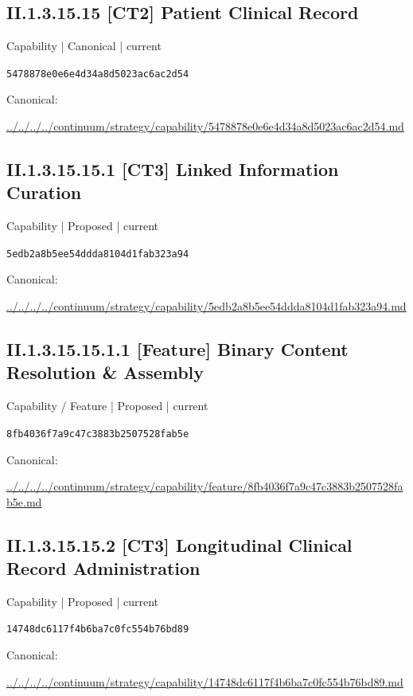 \documentclass[10pt,a4paper]{article}
\begin{document}
\subsection*{II.1.3.15.15 [CT2] Patient Clinical Record}
{\small Capability | Canonical | current}\par
\texttt{5478878e0e6e4d34a8d5023ac6ac2d54}\par
Canonical: \par
{\footnotesize\url{../../../../continuum/strategy/capability/5478878e0e6e4d34a8d5023ac6ac2d54.md}}\par
\subsection*{II.1.3.15.15.1 [CT3] Linked Information Curation}
{\small Capability | Proposed | current}\par
\texttt{5edb2a8b5ee54ddda8104d1fab323a94}\par
Canonical: \par
{\footnotesize\url{../../../../continuum/strategy/capability/5edb2a8b5ee54ddda8104d1fab323a94.md}}\par
\subsection*{II.1.3.15.15.1.1 [Feature] Binary Content Resolution \& Assembly}
{\small Capability / Feature | Proposed | current}\par
\texttt{8fb4036f7a9c47c3883b2507528fab5e}\par
Canonical: \par
{\footnotesize\url{../../../../continuum/strategy/capability/feature/8fb4036f7a9c47c3883b2507528fab5e.md}}\par
\subsection*{II.1.3.15.15.2 [CT3] Longitudinal Clinical Record Administration}
{\small Capability | Proposed | current}\par
\texttt{14748dc6117f4b6ba7c0fc554b76bd89}\par
Canonical: \par
{\footnotesize\url{../../../../continuum/strategy/capability/14748dc6117f4b6ba7c0fc554b76bd89.md}}\par
\end{document}
